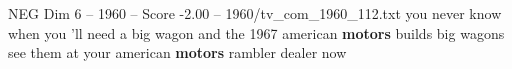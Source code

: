 \begin{textsample}{NEG Dim 6 – 1960 – Score -2.00 – 1960/tv\_com\_1960\_112.txt}  \label{ex:f6_neg_073}
you never know when you 'll need a big wagon and the 1967 american \textbf{motors} builds big wagons see them at your american \textbf{motors} rambler dealer now

\end{textsample}
